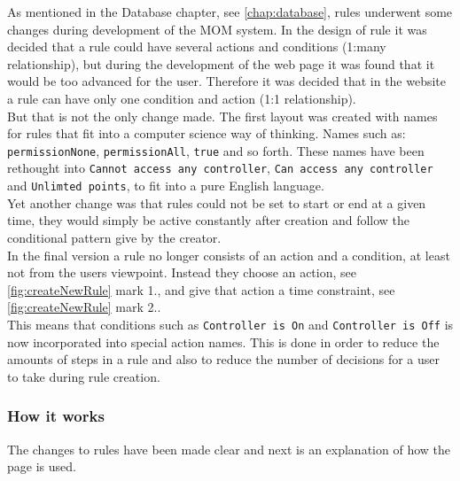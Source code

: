 As mentioned in the Database chapter, see \vref{chap:database}, rules underwent some changes during development of the MOM system. In the design of rule it was decided that a rule could have several actions and conditions (1:many relationship), but during the development of the web page it was found that it would be too advanced for the user. Therefore it was decided that in the website a rule can have only one condition and action (1:1 relationship).\\%
But that is not the only change made. The first layout was created with names for rules that fit into a computer science way of thinking. Names such as: \texttt{permissionNone}, \texttt{permissionAll}, \texttt{true} and so forth. These names have been rethought into \texttt{Cannot access any controller}, \texttt{Can access any controller} and \texttt{Unlimted points}, to fit into a pure English language.\\
Yet another change was that rules could not be set to start or end at a given time, they would simply be active constantly after creation and follow the conditional pattern give by the creator.\\
In the final version a rule no longer consists of an action and a condition, at least not from the users viewpoint. Instead they choose an action, see \ref{fig:createNewRule} mark 1., and give that action a time constraint, see \ref{fig:createNewRule} mark 2..\\
This means that conditions such as \texttt{Controller is On} and \texttt{Controller is Off} is now incorporated into special action names.
This is done in order to reduce the amounts of steps in a rule and also to reduce the number of decisions for a user to take during rule creation.

\subsubsection{How it works}
The changes to rules have been made clear and next is an explanation of how the page is used.\\


